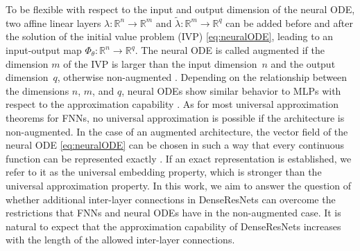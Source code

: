 \documentclass[10pt]{article}
\numberwithin{equation}{section}
\newcommand{\R}{\mathbb{R}}
\begin{document}
	To be flexible with respect to the input and output dimension of the neural ODE, two affine linear layers $\lambda: \R^n \rightarrow \R^m$ and $\tilde \lambda: \R^m \rightarrow \R^q$ can be added before and after the solution of the initial value problem (IVP) \eqref{eq:neuralODE}, leading to an input-output map $\Phi_\theta: \R^n \rightarrow \R^q$. The neural ODE is called augmented if the dimension $m$ of the IVP is larger than the input dimension~$n$ and the output dimension~$q$, otherwise non-augmented \cite{Dupont2019, Kuehn2023}. Depending on the relationship between the dimensions $n$, $m$, and $q$, neural ODEs show similar behavior to MLPs with respect to the approximation capability \cite{Kuehn2024}. As for most universal approximation theorems for FNNs, no universal approximation is possible if the architecture is non-augmented. In the case of an augmented architecture, the vector field of the neural ODE \eqref{eq:neuralODE} can be chosen in such a way that every continuous function can be represented exactly \cite{Kuehn2023}. If an exact representation is established, we refer to it as the universal embedding property, which is stronger than the universal approximation property. In this work, we aim to answer the question of whether additional inter-layer connections in DenseResNets can overcome the restrictions that FNNs and neural ODEs have in the non-augmented case. It is natural to expect that the approximation capability of DenseResNets increases with the length of the allowed inter-layer connections. 
	
\end{document}
